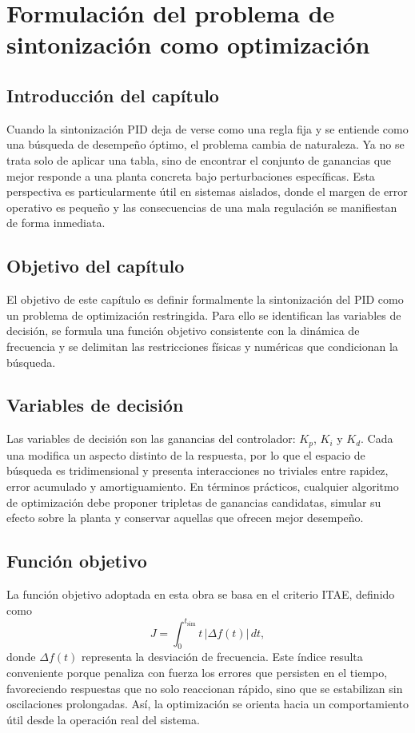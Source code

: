 \chapter{Formulación del problema de sintonización como optimización}
\label{ch:formulacion-optimizacion}

\section{Introducción del capítulo}
Cuando la sintonización PID deja de verse como una regla fija y se entiende como una búsqueda
de desempeño óptimo, el problema cambia de naturaleza. Ya no se trata solo de aplicar una
tabla, sino de encontrar el conjunto de ganancias que mejor responde a una planta concreta
bajo perturbaciones específicas. Esta perspectiva es particularmente útil en sistemas aislados,
donde el margen de error operativo es pequeño y las consecuencias de una mala regulación se
manifiestan de forma inmediata.

\section{Objetivo del capítulo}
El objetivo de este capítulo es definir formalmente la sintonización del PID como un problema
de optimización restringida. Para ello se identifican las variables de decisión, se formula una
función objetivo consistente con la dinámica de frecuencia y se delimitan las restricciones
físicas y numéricas que condicionan la búsqueda.

\section{Variables de decisión}
Las variables de decisión son las ganancias del controlador: $K_p$, $K_i$ y $K_d$. Cada una
modifica un aspecto distinto de la respuesta, por lo que el espacio de búsqueda es
tridimensional y presenta interacciones no triviales entre rapidez, error acumulado y
amortiguamiento. En términos prácticos, cualquier algoritmo de optimización debe proponer
tripletas de ganancias candidatas, simular su efecto sobre la planta y conservar aquellas que
ofrecen mejor desempeño.

\section{Función objetivo}
La función objetivo adoptada en esta obra se basa en el criterio ITAE, definido como
\[
J = \int_0^{t_{\text{sim}}} t\,|\Delta f(t)|\,dt,
\]
donde $\Delta f(t)$ representa la desviación de frecuencia. Este índice resulta conveniente
porque penaliza con fuerza los errores que persisten en el tiempo, favoreciendo respuestas que
no solo reaccionan rápido, sino que se estabilizan sin oscilaciones prolongadas. Así, la
optimización se orienta hacia un comportamiento útil desde la operación real del sistema.

